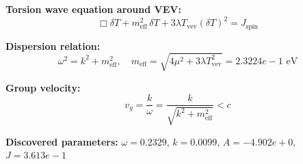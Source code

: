 
\textbf{Torsion wave equation around VEV:}
\begin{equation}
  \Box \delta T + m_{\text{eff}}^2 \, \delta T + 3\lambda T_{\text{vev}} (\delta T)^2 = J_{\text{spin}}
\end{equation}

\textbf{Dispersion relation:}
\begin{equation}
  \omega^2 = k^2 + m_{\text{eff}}^2, \quad
  m_{\text{eff}} = \sqrt{4\mu^2 + 3\lambda T_{\text{vev}}^2} = 2.3224e-1 \text{ eV}
\end{equation}

\textbf{Group velocity:}
\begin{equation}
  v_g = \frac{k}{\omega} = \frac{k}{\sqrt{k^2 + m_{\text{eff}}^2}} < c
\end{equation}

\textbf{Discovered parameters:}
$\omega = 0.2329$, \quad
$k = 0.0099$, \quad
$A = -4.902e+0$, \quad
$J = 3.613e-1$